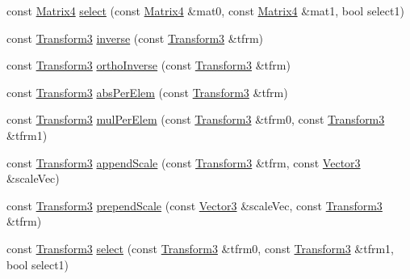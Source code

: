 \begin{DoxyCompactItemize}
\item 
const \hyperlink{classVectormath_1_1Aos_1_1Matrix4}{Matrix4} \hyperlink{namespaceVectormath_1_1Aos_a0cc1dc45cd6c9f4a28c95f78aa6f4003}{select} (const \hyperlink{classVectormath_1_1Aos_1_1Matrix4}{Matrix4} \&mat0, const \hyperlink{classVectormath_1_1Aos_1_1Matrix4}{Matrix4} \&mat1, bool select1)
\item 
const \hyperlink{classVectormath_1_1Aos_1_1Transform3}{Transform3} \hyperlink{namespaceVectormath_1_1Aos_aa0c27f8ceae05802ae843ceecf680a77}{inverse} (const \hyperlink{classVectormath_1_1Aos_1_1Transform3}{Transform3} \&tfrm)
\item 
const \hyperlink{classVectormath_1_1Aos_1_1Transform3}{Transform3} \hyperlink{namespaceVectormath_1_1Aos_abaec787c5e72de90fff9a9de1b7eb2f0}{ortho\-Inverse} (const \hyperlink{classVectormath_1_1Aos_1_1Transform3}{Transform3} \&tfrm)
\item 
const \hyperlink{classVectormath_1_1Aos_1_1Transform3}{Transform3} \hyperlink{namespaceVectormath_1_1Aos_a27ba7865597c41d9f209f588b0f85c5b}{abs\-Per\-Elem} (const \hyperlink{classVectormath_1_1Aos_1_1Transform3}{Transform3} \&tfrm)
\item 
const \hyperlink{classVectormath_1_1Aos_1_1Transform3}{Transform3} \hyperlink{namespaceVectormath_1_1Aos_a19cbd2ab971406284d5e2dc590e5d135}{mul\-Per\-Elem} (const \hyperlink{classVectormath_1_1Aos_1_1Transform3}{Transform3} \&tfrm0, const \hyperlink{classVectormath_1_1Aos_1_1Transform3}{Transform3} \&tfrm1)
\item 
const \hyperlink{classVectormath_1_1Aos_1_1Transform3}{Transform3} \hyperlink{namespaceVectormath_1_1Aos_a05164eff561f1067eb0bed4a1e561eaa}{append\-Scale} (const \hyperlink{classVectormath_1_1Aos_1_1Transform3}{Transform3} \&tfrm, const \hyperlink{classVectormath_1_1Aos_1_1Vector3}{Vector3} \&scale\-Vec)
\item 
const \hyperlink{classVectormath_1_1Aos_1_1Transform3}{Transform3} \hyperlink{namespaceVectormath_1_1Aos_a5f137f9fd9c75a2596a77fad84b75a06}{prepend\-Scale} (const \hyperlink{classVectormath_1_1Aos_1_1Vector3}{Vector3} \&scale\-Vec, const \hyperlink{classVectormath_1_1Aos_1_1Transform3}{Transform3} \&tfrm)
\item 
const \hyperlink{classVectormath_1_1Aos_1_1Transform3}{Transform3} \hyperlink{namespaceVectormath_1_1Aos_a2703e02b1654c805a4bba913188659f5}{select} (const \hyperlink{classVectormath_1_1Aos_1_1Transform3}{Transform3} \&tfrm0, const \hyperlink{classVectormath_1_1Aos_1_1Transform3}{Transform3} \&tfrm1, bool select1)
\item 

\end{DoxyCompactItemize}
